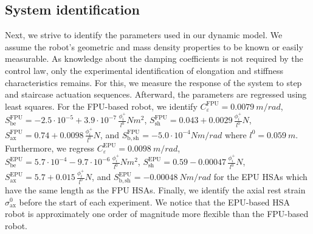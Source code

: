 \subsection{System identification}
Next, we strive to identify the parameters used in our dynamic model.
We assume the robot's geometric and mass density properties to be known or easily measurable. %
As knowledge about the damping coefficients is not required by the control law, only the experimental identification of elongation and stiffness characteristics remains.
For this, we measure the response of the system to step and staircase actuation sequences. Afterward, the parameters are regressed using least squares. %
For the FPU-based robot, we identify $C_\varepsilon^\mathrm{FPU}=\SI{0.0079}{m \per rad}$, $S_\mathrm{be}^\mathrm{FPU} = -2.5 \cdot 10^{-5} + 3.9 \cdot 10^{-7} \, \frac{\phi_i^+}{l^0} \si{Nm^2}$, $S_\mathrm{sh}^\mathrm{FPU} = 0.043 + 0.0029 \, \frac{\phi_i^+}{l^0} \si{N}$, $S_\mathrm{ax}^\mathrm{FPU} = 0.74 + 0.0098 \, \frac{\phi_i^+}{l^0} \si{N}$, and $S_\mathrm{b,sh}^\mathrm{FPU} = -5.0 \cdot 10^{-4} \si{Nm \per rad}$ where $l^0 = \SI{0.059}{m}$. 
Furthermore, we regress $C_\varepsilon^\mathrm{EPU}=\SI{0.0098}{m \per rad}$, $S_\mathrm{be}^\mathrm{EPU} = 5.7 \cdot 10^{-4} -9.7 \cdot 10^{-6} \, \frac{\phi_i^+}{l^0} \si{Nm^2}$, $S_\mathrm{sh}^\mathrm{EPU} = 0.59 - 0.00047 \, \frac{\phi_i^+}{l^0} \si{N}$, $S_\mathrm{ax}^\mathrm{EPU} = 5.7 + 0.015 \, \frac{\phi_i^+}{l^0} \si{N}$, and $S_\mathrm{b,sh}^\mathrm{EPU} = -\SI{0.00048}{Nm \per rad}$ for the EPU \glspl{HSA} which have the same length as the FPU \glspl{HSA}.
Finally, we identify the axial rest strain $\sigma_\mathrm{ax}^0$ before the start of each experiment.
We notice that the EPU-based HSA robot is approximately one order of magnitude more flexible than the FPU-based robot.

